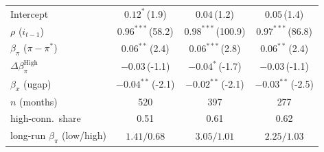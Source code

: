 \begin{tabular}{lccc}
Intercept & $0.12^{*}$\,{\scriptsize(1.9)} & $0.04$\,{\scriptsize(1.2)} & $0.05$\,{\scriptsize(1.4)} \\
$\rho$ ($i_{t-1}$) & $0.96^{***}$\,{\scriptsize(58.2)} & $0.98^{***}$\,{\scriptsize(100.9)} & $0.97^{***}$\,{\scriptsize(86.8)} \\
$\beta_\pi$ ($\pi-\pi^*$) & $0.06^{**}$\,{\scriptsize(2.4)} & $0.06^{***}$\,{\scriptsize(2.8)} & $0.06^{**}$\,{\scriptsize(2.4)} \\
$\Delta\beta_\pi^{\text{High}}$ & $-0.03$\,{\scriptsize(-1.1)} & $-0.04^{*}$\,{\scriptsize(-1.7)} & $-0.03$\,{\scriptsize(-1.1)} \\
$\beta_x$ (ugap) & $-0.04^{**}$\,{\scriptsize(-2.1)} & $-0.02^{**}$\,{\scriptsize(-2.1)} & $-0.03^{**}$\,{\scriptsize(-2.5)} \\
\addlinespace
$n$ (months) & 520 & 397 & 277 \\
high-conn.\ share & 0.51 & 0.61 & 0.62 \\
long-run $\beta_\pi$ (low/high) & $1.41/0.68$ & $3.05/1.01$ & $2.25/1.03$ \\
\bottomrule
\end{tabular}

